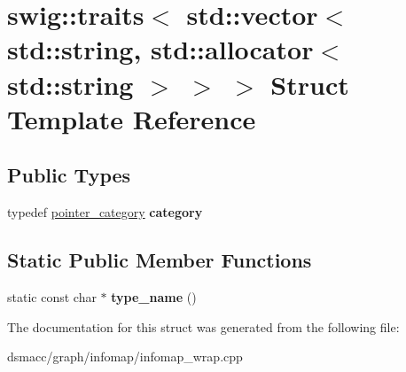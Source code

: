 \hypertarget{structswig_1_1traits_3_01std_1_1vector_3_01std_1_1string_00_01std_1_1allocator_3_01std_1_1string_01_4_01_4_01_4}{}\section{swig\+:\+:traits$<$ std\+:\+:vector$<$ std\+:\+:string, std\+:\+:allocator$<$ std\+:\+:string $>$ $>$ $>$ Struct Template Reference}
\label{structswig_1_1traits_3_01std_1_1vector_3_01std_1_1string_00_01std_1_1allocator_3_01std_1_1string_01_4_01_4_01_4}
\subsection*{Public Types}
\begin{DoxyCompactItemize}
\item 
\mbox{\label{structswig_1_1traits_3_01std_1_1vector_3_01std_1_1string_00_01std_1_1allocator_3_01std_1_1string_01_4_01_4_01_4_a888c5f49b4d76c1791d18b280dc89af6}} 
typedef \mbox{\hyperlink{structswig_1_1pointer__category}{pointer\+\_\+category}} {\bfseries category}
\end{DoxyCompactItemize}
\subsection*{Static Public Member Functions}
\begin{DoxyCompactItemize}
\item 
\mbox{\label{structswig_1_1traits_3_01std_1_1vector_3_01std_1_1string_00_01std_1_1allocator_3_01std_1_1string_01_4_01_4_01_4_a9196f04cf4a0e459d368b9f457bb96f0}} 
static const char $\ast$ {\bfseries type\+\_\+name} ()
\end{DoxyCompactItemize}


The documentation for this struct was generated from the following file\+:\begin{DoxyCompactItemize}
\item 
dsmacc/graph/infomap/infomap\+\_\+wrap.\+cpp\end{DoxyCompactItemize}
